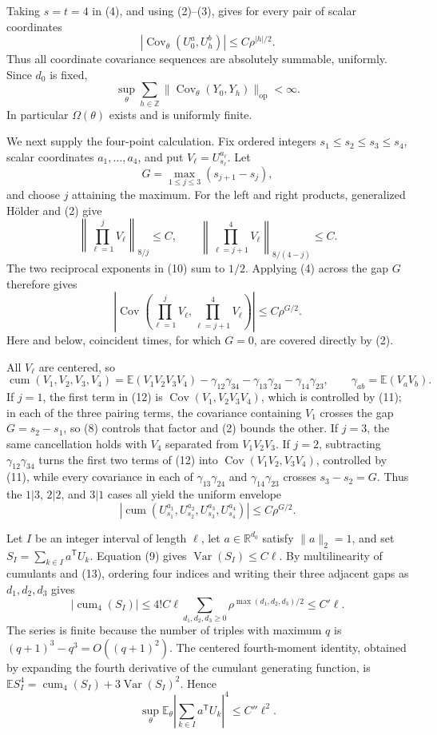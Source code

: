Taking \(s=t=4\) in (4), and using (2)--(3), gives for every pair of scalar coordinates
\[
 |\operatorname{Cov}_\theta(U_0^a,U_h^b)|
 \leq C\rho^{|h|/2}.
\tag{8}
\]
Thus all coordinate covariance sequences are absolutely summable, uniformly.  Since \(d_0\) is fixed,
\[
 \sup_\theta\sum_{h\in\mathbb Z}
 \lVert\operatorname{Cov}_\theta(Y_0,Y_h)\rVert_{\mathrm{op}}<\infty.
\tag{9}
\]
In particular \(\Omega(\theta)\) exists and is uniformly finite.

We next supply the four-point calculation.  Fix ordered integers \(s_1\leq s_2\leq s_3\leq s_4\), scalar coordinates \(a_1,\ldots,a_4\), and put \(V_\ell=U_{s_\ell}^{a_\ell}\).  Let
\[
 G=\max_{1\leq j\leq3}(s_{j+1}-s_j),
\]
and choose \(j\) attaining the maximum.  For the left and right products, generalized H\"older and (2) give
\[
 \left\lVert\prod_{\ell=1}^{j}V_\ell\right\rVert_{8/j}\leq C,
 \qquad
 \left\lVert\prod_{\ell=j+1}^{4}V_\ell\right\rVert_{8/(4-j)}\leq C.
\tag{10}
\]
The two reciprocal exponents in (10) sum to \(1/2\).  Applying (4) across the gap \(G\) therefore gives
\[
 \left|\operatorname{Cov}\left(
 \prod_{\ell=1}^{j}V_\ell,
 \prod_{\ell=j+1}^{4}V_\ell\right)\right|
 \leq C\rho^{G/2}.
\tag{11}
\]
Here and below, coincident times, for which \(G=0\), are covered directly by (2).

All \(V_\ell\) are centered, so
\[
 \operatorname{cum}(V_1,V_2,V_3,V_4)
 =\mathbb E(V_1V_2V_3V_4)
 -\gamma_{12}\gamma_{34}-\gamma_{13}\gamma_{24}-\gamma_{14}\gamma_{23},
 \qquad \gamma_{ab}=\mathbb E(V_aV_b).
\tag{12}
\]
If \(j=1\), the first term in (12) is \(\operatorname{Cov}(V_1,V_2V_3V_4)\), which is controlled by (11); in each of the three pairing terms, the covariance containing \(V_1\) crosses the gap \(G=s_2-s_1\), so (8) controls that factor and (2) bounds the other.  If \(j=3\), the same cancellation holds with \(V_4\) separated from \(V_1V_2V_3\).  If \(j=2\), subtracting \(\gamma_{12}\gamma_{34}\) turns the first two terms of (12) into \(\operatorname{Cov}(V_1V_2,V_3V_4)\), controlled by (11), while every covariance in each of \(\gamma_{13}\gamma_{24}\) and \(\gamma_{14}\gamma_{23}\) crosses \(s_3-s_2=G\).  Thus the \(1|3\), \(2|2\), and \(3|1\) cases all yield the uniform envelope
\[
 |\operatorname{cum}(U_{s_1}^{a_1},U_{s_2}^{a_2},U_{s_3}^{a_3},U_{s_4}^{a_4})|
 \leq C\rho^{G/2}.
\tag{13}
\]

Let \(I\) be an integer interval of length \(\ell\), let \(a\in\mathbb R^{d_0}\) satisfy \(\lVert a\rVert_2=1\), and set \(S_I=\sum_{k\in I}a^{\mathsf T}U_k\).  Equation (9) gives \(\operatorname{Var}(S_I)\leq C\ell\).  By multilinearity of cumulants and (13), ordering four indices and writing their three adjacent gaps as \(d_1,d_2,d_3\) gives
\[
 |\operatorname{cum}_4(S_I)|
 \leq 4!C\ell
 \sum_{d_1,d_2,d_3\geq0}\rho^{\max(d_1,d_2,d_3)/2}
 \leq C'\ell.
\tag{14}
\]
The series is finite because the number of triples with maximum \(q\) is \((q+1)^3-q^3=O((q+1)^2)\).  The centered fourth-moment identity, obtained by expanding the fourth derivative of the cumulant generating function, is \(\mathbb E S_I^4=\operatorname{cum}_4(S_I)+3\operatorname{Var}(S_I)^2\).  Hence
\[
 \sup_\theta\mathbb E_\theta
 \left|\sum_{k\in I}a^{\mathsf T}U_k\right|^4
 \leq C''\ell^2.
\tag{15}
\]


